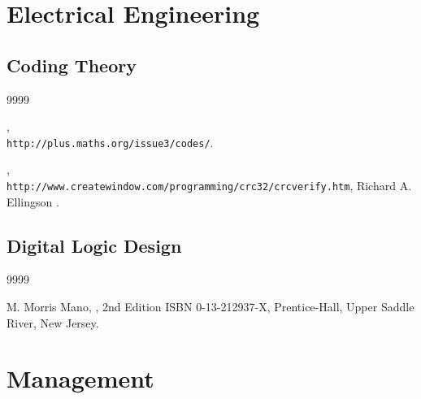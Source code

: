 
\section*{Electrical Engineering}

\subsection*{Coding Theory}

\begin{thecustombibliography}{9999}

, \\
\texttt{http://plus.maths.org/issue3/codes/}.

, \\
\texttt{http://www.createwindow.com/programming/crc32/crcverify.htm},
Richard A. Ellingson \cite{bibref:i:richardaellingson}.

\end{thecustombibliography}

\subsection*{Digital Logic Design}

\begin{thecustombibliography}{9999}

M. Morris Mano, 
, 2nd Edition
ISBN 0-13-212937-X, Prentice-Hall, Upper Saddle River, New Jersey.

\end{thecustombibliography}


\section*{Management}



